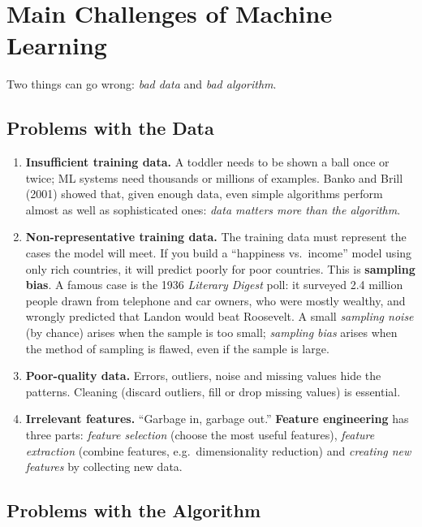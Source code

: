 \section{Main Challenges of Machine Learning}

Two things can go wrong: \emph{bad data} and \emph{bad algorithm}.

\subsection{Problems with the Data}

\begin{enumerate}
  \item \textbf{Insufficient training data.} A toddler needs to be shown a ball once or twice; ML systems need thousands or millions of examples. Banko and Brill (2001) showed that, given enough data, even simple algorithms perform almost as well as sophisticated ones: \emph{data matters more than the algorithm}.
  \item \textbf{Non-representative training data.} The training data must represent the cases the model will meet. If you build a ``happiness vs.\ income'' model using only rich countries, it will predict poorly for poor countries. This is \textbf{sampling bias}. A famous case is the 1936 \emph{Literary Digest} poll: it surveyed 2.4 million people drawn from telephone and car owners, who were mostly wealthy, and wrongly predicted that Landon would beat Roosevelt. A small \emph{sampling noise} (by chance) arises when the sample is too small; \emph{sampling bias} arises when the method of sampling is flawed, even if the sample is large.
  \item \textbf{Poor-quality data.} Errors, outliers, noise and missing values hide the patterns. Cleaning (discard outliers, fill or drop missing values) is essential.
  \item \textbf{Irrelevant features.} ``Garbage in, garbage out.'' \textbf{Feature engineering} has three parts: \emph{feature selection} (choose the most useful features), \emph{feature extraction} (combine features, e.g.\ dimensionality reduction) and \emph{creating new features} by collecting new data.
\end{enumerate}

\subsection{Problems with the Algorithm}

